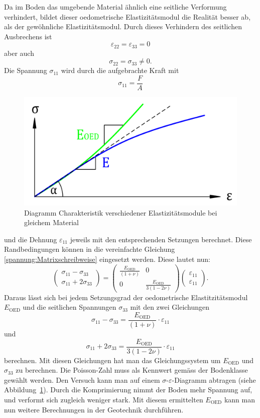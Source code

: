Da im Boden das umgebende Material ähnlich eine seitliche Verformung verhindert,
bildet dieser oedometrische Elastizitätsmodul die Realität besser ab, als der gewöhnliche Elastizitätsmodul.
Durch dieses Verhindern des seitlichen Ausbrechens ist
\[
\varepsilon_{22}
=
\varepsilon_{33}
=
0
\]
aber auch
\[
\sigma_{22}
=
\sigma_{33}
\neq 0
.
\]
Die Spannung $\sigma_{11}$ wird durch die aufgebrachte Kraft mit
\[
\sigma_{11}
=
\frac{F}{A}
\]
\begin{figure}
	\centering
	\includegraphics[width=0.45\linewidth,keepaspectratio]{papers/spannung/Grafiken/DiagrammOedometer-Versuch.png}
	\caption{Diagramm Charakteristik verschiedener Elastizitätsmodule bei gleichem Material}
	\label{fig:DiagrammOedometer-Versuch}
\end{figure}%
und die Dehnung $\varepsilon_{11}$ jeweils mit den entsprechenden Setzungen berechnet.
Diese Randbedingungen können in die vereinfachte Gleichung \eqref{spannung:Matrixschreibweise} eingesetzt werden.
Diese lautet nun:
\[
\begin{pmatrix}
	\sigma_{11}-\sigma_{33} \\
	\sigma_{11}+2\sigma_{33}
\end{pmatrix}
=
\begin{pmatrix}
	\displaystyle{\frac{E_{\text{OED}}}{(1+\nu)}} &                                               0 \\
                                                0 & \displaystyle{\frac{E_{\text{OED}}}{3(1-2\nu)}}
\end{pmatrix}
\begin{pmatrix}
	\varepsilon_{11}\\
	\varepsilon_{11}
\end{pmatrix}
.
\]
Daraus lässt sich bei jedem Setzungsgrad der oedometrische Elastitzitätsmodul $E_{\text{OED}}$ und die seitlichen Spannungen $\sigma_{33}$ mit den zwei Gleichungen
\[
\sigma_{11}-\sigma_{33}
=
\frac{E_{\text{OED}}}{(1+\nu)}\cdot\varepsilon_{11}
\]
und
\[
\sigma_{11}+2\sigma_{33}
=
\frac{E_{\text{OED}}}{3(1-2\nu)}\cdot\varepsilon_{11}
\]
berechnen.
Mit diesen Gleichungen hat man das Gleichungssystem um $E_{\text{OED}}$ und $\sigma_{33}$ zu berechnen.
Die Poisson-Zahl muss als Kennwert gemäss der Bodenklasse gewählt werden.
Den Versuch kann man auf einem $\sigma$-$\varepsilon$-Diagramm abtragen (siehe Abbildung~\ref{fig:DiagrammOedometer-Versuch}).
Durch die Komprimierung nimmt der Boden mehr Spannung auf, und verformt sich zugleich weniger stark.
Mit diesem ermittelten $E_{\text{OED}}$ kann man nun weitere Berechnungen in der Geotechnik durchführen.

